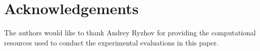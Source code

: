 \cleardoublepage
{}
{}
\section*{Acknowledgements}

The authors would like to thank Andrey Ryzhov for providing the computational resources used to conduct the experimental evaluations in this paper.